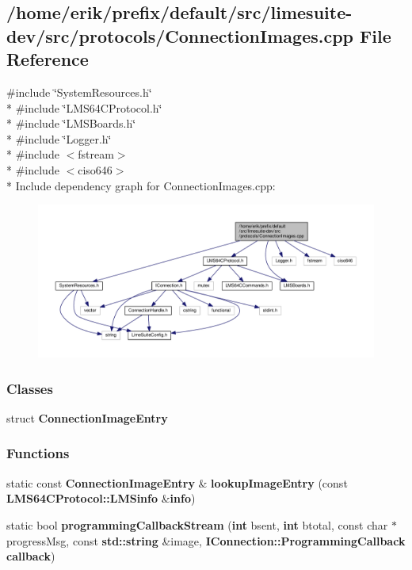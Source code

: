 \subsection{/home/erik/prefix/default/src/limesuite-\/dev/src/protocols/\+Connection\+Images.cpp File Reference}
\label{ConnectionImages_8cpp}
{\ttfamily \#include \char`\"{}System\+Resources.\+h\char`\"{}}\\*
{\ttfamily \#include \char`\"{}L\+M\+S64\+C\+Protocol.\+h\char`\"{}}\\*
{\ttfamily \#include \char`\"{}L\+M\+S\+Boards.\+h\char`\"{}}\\*
{\ttfamily \#include \char`\"{}Logger.\+h\char`\"{}}\\*
{\ttfamily \#include $<$fstream$>$}\\*
{\ttfamily \#include $<$ciso646$>$}\\*
Include dependency graph for Connection\+Images.\+cpp\+:
\nopagebreak
\begin{figure}[H]
\begin{center}
\leavevmode
\includegraphics[width=350pt]{d6/d0b/ConnectionImages_8cpp__incl}
\end{center}
\end{figure}
\subsubsection*{Classes}
\begin{DoxyCompactItemize}
\item 
struct {\bf Connection\+Image\+Entry}
\end{DoxyCompactItemize}
\subsubsection*{Functions}
\begin{DoxyCompactItemize}
\item 
static const {\bf Connection\+Image\+Entry} \& {\bf lookup\+Image\+Entry} (const {\bf L\+M\+S64\+C\+Protocol\+::\+L\+M\+Sinfo} \&{\bf info})
\item 
static bool {\bf programming\+Callback\+Stream} ({\bf int} bsent, {\bf int} btotal, const char $\ast$progress\+Msg, const {\bf std\+::string} \&image, {\bf I\+Connection\+::\+Programming\+Callback} {\bf callback})
\end{DoxyCompactItemize}


